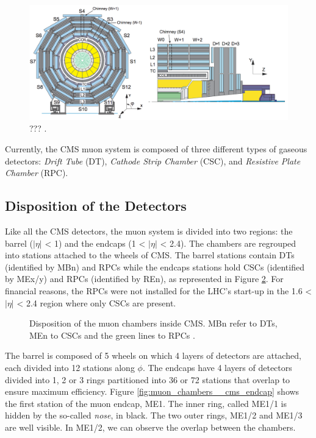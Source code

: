     \begin{figure}[h!]
      \centering
      \includegraphics[width=\textwidth]{img/I-3-cms/muon-numbering.png}
      \caption{??? \cite{Chatrchyan:2009si}.}
      \label{fig:I-3-cms-muon-numbering}
    \end{figure}


    		Currently, the CMS muon system \Cite{CMS_at_LHC, CMS_Performances} is composed of three different types of gaseous detectors: \emph{Drift Tube} (DT), \emph{Cathode Strip Chamber} (CSC), and \emph{Resistive Plate Chamber} (RPC).

    		\subsection{Disposition of the Detectors}
    		\label{sec:muon_chambers__disposition_of_the_detectors}

    			Like all the CMS detectors, the muon system is divided into two regions: the barrel ($ | \eta | $ < 1) and the endcaps (1 < $ | \eta | $ < 2.4). The chambers are regrouped into stations attached to the wheels of CMS. The barrel stations contain DTs (identified by MBn) and RPCs while the endcaps stations hold CSCs (identified by MEx/y) and RPCs (identified by REn), as represented in Figure \ref{fig:muon_chambers__placement}. For financial reasons, the RPCs were not installed for the LHC's start-up in the 1.6 < $ | \eta | $ < 2.4 region where only CSCs are present.

    			\begin{figure}[h!]
    				\centering
    				\caption{Disposition of the muon chambers inside CMS. MBn refer to DTs, MEn to CSCs and the green lines to RPCs \Cite{CMS_Upgrades}.}
    				\label{fig:muon_chambers__placement}
    			\end{figure}

    			The barrel is composed of 5 wheels on which 4 layers of detectors are attached, each divided into 12 stations along $ \phi $. The endcaps have 4 layers of detectors divided into 1, 2 or 3 rings partitioned into 36 or 72 stations that overlap to ensure maximum efficiency. Figure \ref{fig:muon_chambers__cms_endcap} shows the first station of the muon endcap, ME1. The inner ring, called ME1/1 is hidden by the so-called \emph{nose}, in black. The two outer rings, ME1/2 and ME1/3 are well visible. In ME1/2, we can observe the overlap between the chambers. \\

